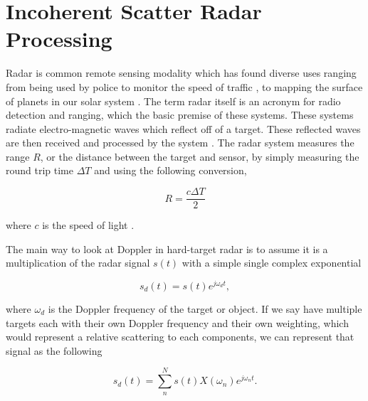 \chapter{Incoherent Scatter Radar Processing}
\label{chapter:isrproc}
\thispagestyle{myheadings}

\graphicspath{{2_ISRProc/Figures/}}


Radar is common remote sensing modality which has found diverse uses ranging from being used by police to monitor the speed of traffic \cite{richards2010principles}, to mapping the surface of planets in our solar system \cite{campbell2002radar}. The term radar itself is an acronym for radio detection and ranging, which the basic premise of these systems. These systems radiate electro-magnetic waves which reflect off of a target. These reflected waves are then received and processed by the system \cite{skolnik2008radar}. The radar system measures the range $R$, or the distance between the target and sensor, by simply measuring the round trip time $\Delta T$ and using the following conversion,

\begin{equation}
\label{eqn:range_intro}
R=\frac{c\Delta T}{2}
\end{equation}

\noindent where $c$ is the speed of light \cite{richards2010principles}.




The main way to look at Doppler in hard-target radar is to assume it is a multiplication of the radar signal $s(t)$ with a simple single complex exponential

\begin{equation}
\label{simpledop}
s_d(t) = s(t)e^{j\omega_d t},
\end{equation}
 
\noindent where $\omega_d$ is the Doppler frequency of the target or object.  If we say have multiple targets each with their own Doppler frequency and their own weighting, which would represent a relative scattering to each components,  we can represent that signal as the following

\begin{equation}
\label{multiDop}
\displaystyle s_d(t) = \sum_{n}^{N} s(t)X(\omega_n)e^{j\omega_{n} t}.
\end{equation}

